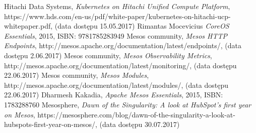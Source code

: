 \documentclass[10pt,a4paper,titlepage,twoside]{report}
\begin{document}
\begin{thebibliography}{99}
Hitachi Data Systems, \textit{Kubernetes on Hitachi Unified Compute Platform}, https://www.hds.com/en-us/pdf/white-paper/kubernetes-on-hitachi-ucp-whitepaper.pdf, (data dostępu 15.05.2017)
Rimantas Mocevicius \textit{CoreOS Essentials}, 2015, ISBN: 9781785283949
Mesos community, \textit{Mesos HTTP Endpoints}, http://mesos.apache.org/documentation/latest/endpoints/, (data dostępu 2.06.2017)
Mesos community, \textit{Mesos Observability Metrics}, http://mesos.apache.org/documentation/latest/monitoring/, (data dostępu 22.06.2017)
Mesos community, \textit{Mesos Modules}, http://mesos.apache.org/documentation/latest/modules/, (data dostępu 22.06.2017)
Dharmesh Kakadia, \textit{Apache Mesos Essentials}, 2015, ISBN: 1783288760
Mesosphere, \textit{Dawn of the Singularity: A look at HubSpot’s first year on Mesos}, https://mesosphere.com/blog/dawn-of-the-singularity-a-look-at-hubspots-first-year-on-mesos/, (data dostępu 30.07.2017)
\end{thebibliography}

\end{document}
